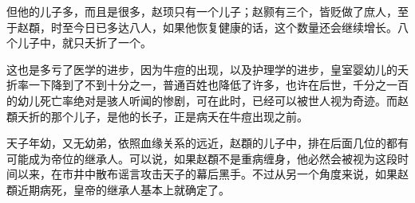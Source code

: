但他的儿子多，而且是很多，赵顼只有一个儿子；赵颢有三个，皆贬做了庶人，至于赵頵，时至今日已多达八人，如果他恢复健康的话，这个数量还会继续增长。八个儿子中，就只夭折了一个。

这也是多亏了医学的进步，因为牛痘的出现，以及护理学的进步，皇室婴幼儿的夭折率一下降到了不到十分之一，普通百姓也降低了许多，也许在后世，千分之一百的幼儿死亡率绝对是骇人听闻的惨剧，可在此时，已经可以被世人视为奇迹。而赵頵夭折的那个儿子，是他的长子，正是病夭在牛痘出现之前。

天子年幼，又无幼弟，依照血缘关系的远近，赵頵的儿子中，排在后面几位的都有可能成为帝位的继承人。可以说，如果赵頵不是重病缠身，他必然会被视为这段时间以来，在市井中散布谣言攻击天子的幕后黑手。不过从另一个角度来说，如果赵頵近期病死，皇帝的继承人基本上就确定了。

